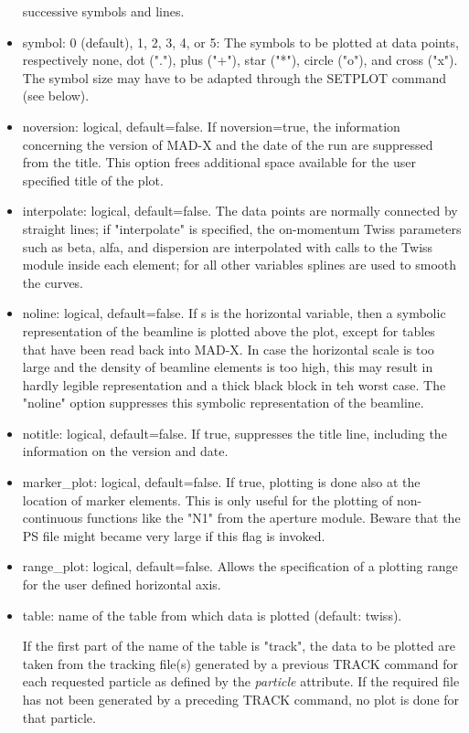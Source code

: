 \begin{itemize}
     successive symbols and lines.
   \item symbol: 0 (default), 1, 2, 3, 4, or 5: The symbols to be
     plotted at data points, respectively none, dot ("."), plus ("+"),
     star ("*"), circle ("o"), and cross ("x").  
     The symbol size may have to be adapted through the SETPLOT command
     (see below).   
   \item noversion: logical, default=false. If noversion=true, the
     information concerning the version of MAD-X and the date of the run
     are suppressed from the title.  
     This option frees additional space available for the user specified
     title of the plot.  
   \item interpolate: logical, default=false. The data points are
     normally connected by straight lines; if "interpolate" is
     specified, the on-momentum Twiss parameters such as beta, alfa, and
     dispersion are interpolated with calls to the Twiss module inside
     each element; for all other variables splines are used to smooth
     the curves.  
   \item noline: logical, default=false. If s is the horizontal
     variable, then a symbolic representation of the beamline is plotted
     above the plot, except for tables that have been read back into MAD-X. 
     In case the horizontal scale is too large and the density of
     beamline elements is too high, this may result in hardly legible
     representation and a thick black block in teh worst case. 
     The "noline" option suppresses this symbolic representation of the
     beamline. 
   \item notitle: logical, default=false. If true, suppresses the title
     line, including the information on the version and date.  
   \item marker\_plot: logical, default=false. If true, plotting is done
     also at the location of marker elements. This is only useful for
     the plotting of non-continuous functions like the "N1" from the
     aperture module. Beware that the PS file might became very large if
     this flag is invoked.  
   \item range\_plot: logical, default=false. Allows the specification
     of a plotting range for the user defined horizontal axis.   


   \item table: name of the table from which data is plotted (default:
     twiss).  

     If the first part of the name of the table is "track", the
     data to be plotted are taken from the tracking file(s) generated by
     a previous TRACK command for each requested particle as defined by
     the \textit{particle} attribute. If the required file has not been
     generated by a preceding TRACK command, no plot is done for that
     particle.   


\end{itemize}
